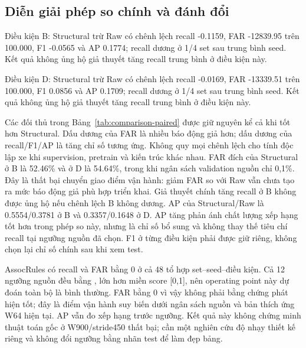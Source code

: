 \documentclass[12pt,a4paper,oneside,openany]{extbook}
\DeclareRobustCommand{\code}[1]{\texttt{\detokenize{#1}}}
\begin{document}
\subsection{Diễn giải phép so chính và đánh đổi}
Điều kiện B: Structural trừ Raw có chênh lệch recall -0.1159, FAR -12839.95 trên 100.000, F1 -0.0565 và AP 0.1774; recall dương ở 1/4 set sau trung bình seed. Kết quả không ủng hộ giả thuyết tăng recall trung bình ở điều kiện này. 

Điều kiện D: Structural trừ Raw có chênh lệch recall -0.0169, FAR -13339.51 trên 100.000, F1 0.0856 và AP 0.1709; recall dương ở 1/4 set sau trung bình seed. Kết quả không ủng hộ giả thuyết tăng recall trung bình ở điều kiện này. 

Các đối thủ trong Bảng~\ref{tab:comparison-paired} được giữ nguyên kể cả khi tốt hơn Structural. Dấu dương của FAR là nhiều báo động giả hơn; dấu dương của recall/F1/AP là tăng chỉ số tương ứng. Không quy mọi chênh lệch cho tính độc lập xe khi supervision, pretrain và kiến trúc khác nhau.
FAR đích của Structural ở B là 52.46\% và ở D là 54.64\%, trong khi ngân sách validation nguồn chỉ 0,1\%. Đây là thất bại chuyển giao điểm vận hành: giảm FAR so với Raw vẫn chưa tạo ra mức báo động giả phù hợp triển khai. Giả thuyết chính tăng recall ở B không được ủng hộ nếu chênh lệch B không dương. AP của Structural/Raw là 0.5554/0.3781 ở B và 0.3357/0.1648 ở D. AP tăng phản ánh chất lượng xếp hạng tốt hơn trong phép so này, nhưng là chỉ số bổ sung và không thay thế tiêu chí recall tại ngưỡng nguồn đã chọn. F1 ở từng điều kiện phải được giữ riêng, không chọn lại chỉ số chính sau khi xem test.

AssocRules có recall và FAR bằng 0 ở cả 48 tổ hợp set--seed--điều kiện. Cả 12 ngưỡng nguồn đều bằng \code{1.0000000000000002}, lớn hơn miền score [0,1], nên operating point này dự đoán toàn bộ là bình thường. FAR bằng 0 vì vậy không phải bằng chứng phát hiện tốt; đây là điểm vận hành suy biến dưới ngân sách nguồn và bản thích ứng W64 hiện tại. AP vẫn đo xếp hạng trước ngưỡng. Kết quả này không chứng minh thuật toán gốc ở W900/stride450 thất bại; cần một nghiên cứu độ nhạy thiết kế riêng và không đổi ngưỡng bằng nhãn test để làm đẹp bảng.
\end{document}
